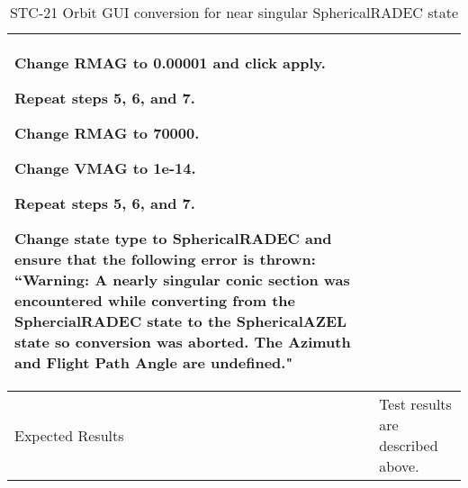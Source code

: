 \begin{table}[htbp!]
\begin{tabular}{|p{1.05 in} |p{4.75 in} |}
\begin{compactenum}
                 \item Change RMAG to 0.00001 and click apply.
                 \item Repeat steps 5, 6, and 7.
                 \item Change RMAG to 70000.
                 \item Change VMAG to 1e-14.
                 \item Repeat steps 5, 6, and 7.
                 \item Change state type to SphericalRADEC and ensure that the following error is thrown: ``Warning: A nearly singular conic section was encountered while converting from the SphercialRADEC state to the SphericalAZEL state so conversion was aborted.  The Azimuth and Flight Path Angle are undefined."
         \end{compactenum}
         \\ \hline
         Expected Results & Test results are described above.\\
      \hline
      \end{tabular}
      \label{Table:STC-21}
      \caption{STC-21 Orbit GUI conversion for near singular SphericalRADEC state}
\end{table}
